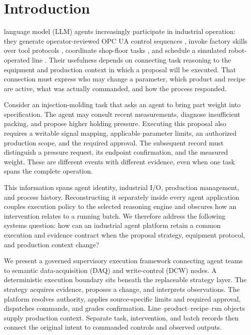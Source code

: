 \section{Introduction}
 language model (LLM) agents increasingly participate in
industrial operation: they generate operator-reviewed OPC UA control sequences
\cite{huang2026made}, invoke factory skills over tool protocols
\cite{koehle2026llmdriven}, coordinate shop-floor tasks
\cite{lim2025llmenabled,zhao2026shopfloor}, and schedule a simulated
robot-operated line \cite{waseem2026pretrained}. Their usefulness depends on
connecting task reasoning to the equipment and production context in which
a proposal will be executed. That connection must express who may change a
parameter, which product and recipe are active, what was actually commanded,
and how the process responded.

Consider an injection-molding task that asks an agent to bring part weight
into specification. The agent may consult recent measurements, diagnose
insufficient packing, and propose higher holding pressure. Executing this
proposal also requires a writable signal mapping, applicable parameter
limits, an authorized production scope, and the required approval. The
subsequent record must distinguish a pressure request, its endpoint
confirmation, and the measured weight. These are different events with
different evidence, even when one task spans the complete operation.

This information spans agent identity, industrial I/O, production
management, and process history. Reconstructing it separately inside every
agent application couples execution policy to the selected reasoning
engine and obscures how an intervention relates to a running batch. We
therefore address the following systems question: how can an industrial
agent platform retain a common execution and evidence contract when the
proposal strategy, equipment protocol, and production context change?

We present a governed supervisory execution framework connecting agent
teams to semantic data-acquisition (DAQ) and write-control (DCW) nodes.
A deterministic execution boundary sits beneath the replaceable strategy
layer. The strategy acquires evidence, proposes a change, and interprets
observations. The platform resolves authority, applies source-specific
limits and required approval, dispatches commands, and grades confirmation.
Line--product--recipe--run objects supply production context.
Separate task, intervention, and batch records then connect the original
intent to commanded controls and observed outputs.

